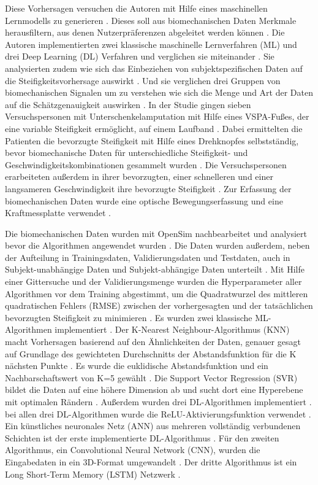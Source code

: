 Diese Vorhersagen versuchen die Autoren mit Hilfe eines maschinellen Lernmodells zu generieren \cite{Shetty.2022}. Dieses soll aus biomechanischen Daten Merkmale herausfiltern, aus denen Nutzerpräferenzen abgeleitet werden können \cite{Shetty.2022}.
Die Autoren implementierten zwei klassische maschinelle Lernverfahren (ML) und drei Deep Learning (DL) Verfahren und verglichen sie miteinander \cite{Shetty.2022}.
Sie analysierten zudem wie sich das Einbeziehen von subjektspezifischen Daten auf die Steifigkeitsvorhersage auswirkt \cite{Shetty.2022}. Und sie verglichen drei Gruppen von biomechanischen Signalen um zu verstehen wie sich die Menge und Art der Daten auf die Schätzgenauigkeit auswirken \cite{Shetty.2022}.
In der Studie gingen sieben Versuchspersonen mit Unterschenkelamputation mit Hilfe eines VSPA-Fußes, der eine variable Steifigkeit ermöglicht, auf einem Laufband \cite{Shetty.2022}. Dabei ermittelten die Patienten die bevorzugte Steifigkeit mit Hilfe eines Drehknopfes selbstständig, bevor biomechanische Daten für unterschiedliche Steifigkeit- und Geschwindigkeitskombinationen gesammelt wurden \cite{Shetty.2022}. Die Versuchspersonen erarbeiteten außerdem in ihrer bevorzugten, einer schnelleren und einer langsameren Geschwindigkeit ihre bevorzugte Steifigkeit \cite{Shetty.2022}. Zur Erfassung der biomechanischen Daten wurde eine optische Bewegungserfassung und eine Kraftmessplatte verwendet \cite{Shetty.2022}.

Die biomechanischen Daten wurden mit OpenSim nachbearbeitet und analysiert bevor die Algorithmen angewendet wurden \cite{Shetty.2022}. Die Daten wurden außerdem, neben der Aufteilung in Trainingsdaten, Validierungsdaten und Testdaten, auch in Subjekt-unabhängige Daten und Subjekt-abhängige Daten unterteilt \cite{Shetty.2022}. Mit Hilfe einer Gittersuche und der Validierungsmenge wurden die Hyperparameter aller Algorithmen vor dem Training abgestimmt, um die Quadratwurzel des mittleren quadratischen Fehlers (RMSE) zwischen der vorhergesagten und der tatsächlichen bevorzugten Steifigkeit zu minimieren \cite{Shetty.2022}.
Es wurden zwei klassische ML-Algorithmen implementiert \cite{Shetty.2022}. Der K-Nearest Neighbour-Algorithmus (KNN) macht Vorhersagen basierend auf den Ähnlichkeiten der Daten, genauer gesagt auf Grundlage des gewichteten Durchschnitts der Abstandsfunktion für die K nächsten Punkte \cite{Shetty.2022}. Es wurde die euklidische Abstandsfunktion und ein Nachbarschaftswert von K=5 gewählt \cite{Shetty.2022}. Die Support Vector Regression (SVR) bildet die Daten auf eine höhere Dimension ab und sucht dort eine Hyperebene mit optimalen Rändern \cite{Shetty.2022}. Außerdem wurden drei DL-Algorithmen implementiert \cite{Shetty.2022}. bei allen drei DL-Algorithmen wurde die ReLU-Aktivierungsfunktion verwendet \cite{Shetty.2022}. Ein künstliches neuronales Netz (ANN) aus mehreren vollständig verbundenen Schichten ist der erste implementierte DL-Algorithmus \cite{Shetty.2022}. Für den zweiten Algorithmus, ein Convolutional Neural Network (CNN), wurden die Eingabedaten in ein 3D-Format umgewandelt \cite{Shetty.2022}. Der dritte Algorithmus ist ein Long Short-Term Memory (LSTM) Netzwerk \cite{Shetty.2022}.


